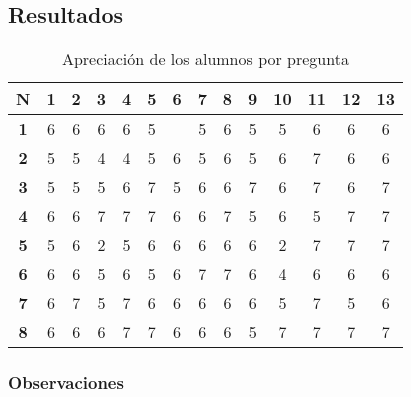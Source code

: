 \subsection{Resultados}

\begin{table}[H]
\centering
\begin{tabulary}{\textwidth}{cccccccccccccc}
\toprule
\textbf{N}      & \textbf{1} & \textbf{2} & \textbf{3} & \textbf{4} & \textbf{5}
& \textbf{6} & \textbf{7} & \textbf{8} & \textbf{9} & \textbf{10} & \textbf{11}
& \textbf{12} & \textbf{13} \\
\midrule
\textbf{1}      & 6 & 6 & 6 & 6 & 5 &   & 5 & 6 & 5 & 5  & 6  & 6  & 6  \\
\textbf{2}      & 5 & 5 & 4 & 4 & 5 & 6 & 5 & 6 & 5 & 6  & 7  & 6  & 6  \\
\textbf{3}      & 5 & 5 & 5 & 6 & 7 & 5 & 6 & 6 & 7 & 6  & 7  & 6  & 7  \\
\textbf{4}      & 6 & 6 & 7 & 7 & 7 & 6 & 6 & 7 & 5 & 6  & 5  & 7  & 7  \\
\textbf{5}      & 5 & 6 & 2 & 5 & 6 & 6 & 6 & 6 & 6 & 2  & 7  & 7  & 7  \\
\textbf{6}      & 6 & 6 & 5 & 6 & 5 & 6 & 7 & 7 & 6 & 4  & 6  & 6  & 6  \\ 
\textbf{7}      & 6 & 7 & 5 & 7 & 6 & 6 & 6 & 6 & 6 & 5  & 7  & 5  & 6  \\ 
\textbf{8}      & 6 & 6 & 6 & 7 & 7 & 6 & 6 & 6 & 5 & 7  & 7  & 7  & 7  \\ 
\bottomrule
\end{tabulary}
\caption{Apreciación de los alumnos por pregunta} 
\end{table}

\subsubsection{Observaciones}

